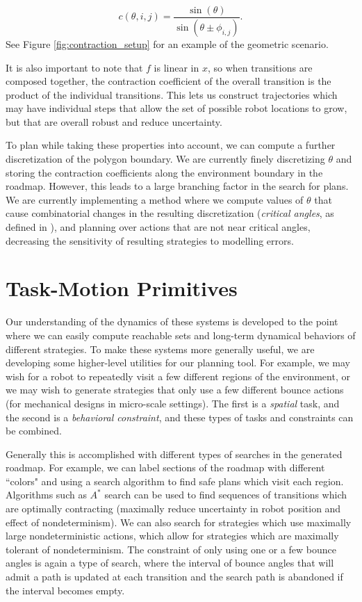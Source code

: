 \documentclass[conference]{IEEEtran}
\begin{document}
$$
c(\theta, i,j) = \frac{\sin(\theta)}{\sin(\theta \pm \phi_{i,j})}.
$$
See Figure \ref{fig:contraction_setup} for an example of the geometric
scenario.

It is also important to note that $f$ is linear in $x$, so when transitions are
composed together, the contraction coefficient of the overall transition is the
product of the individual transitions. This lets us construct trajectories which
may have individual steps that allow the set of possible
robot locations to grow, but that are overall robust and reduce uncertainty.

To plan while taking these properties into account, we can compute a further
discretization of the polygon boundary. We are currently finely discretizing $\theta$ and
storing the contraction coefficients along the environment boundary in the roadmap. However, 
this leads to a large branching factor in the search for plans. We
are currently implementing a method where we compute values of $\theta$ that
cause combinatorial
changes in the resulting discretization ({\em critical angles}, as defined in
\cite{ErLav13}), and planning over actions that are not near critical angles,
decreasing the sensitivity of resulting strategies to modelling errors.

\section{Task-Motion Primitives}

Our understanding of the dynamics of these systems is developed to the point
where we can easily compute reachable sets and long-term dynamical behaviors of
different strategies. To make these systems more generally useful, 
we are developing some higher-level utilities for our planning
tool. For example, we may wish for a robot to repeatedly visit a few different regions of the
environment, or we may wish
to generate strategies that only use a few different bounce actions (for
mechanical designs in micro-scale settings). The first is a {\em spatial} task,
and the second is a {\em behavioral constraint}, and these types of tasks and constraints
can be combined.

Generally this is accomplished with different types of
searches in the generated roadmap. For example, we can label sections of the roadmap with
different ``colors" and using a search algorithm to find safe plans which visit
each region. Algorithms such as $A^*$ search can be used to find sequences of
transitions which are optimally contracting (maximally reduce uncertainty in robot
position and effect of nondeterminism). We can also search for strategies which
use maximally large nondeterministic actions, which allow for strategies which
are maximally tolerant of nondeterminism. The constraint of only using
one or a few bounce angles is again a type of search, where the interval of
bounce angles that will admit a path is updated at each transition and the
search path is abandoned if the interval becomes empty.
\end{document}
